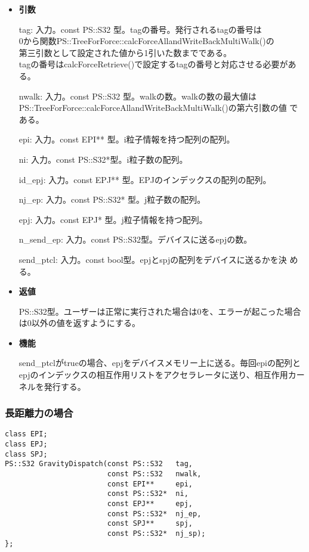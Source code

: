 \begin{itemize}

\item {\bf 引数}

  tag: 入力。const PS::S32 型。tagの番号。発行されるtagの番号は\\
  0から関数PS::TreeForForce::calcForceAllandWriteBackMultiWalk()の\\
  第三引数として設定された値から1引いた数までである。\\
  tagの番号はcalcForceRetrieve()で設定するtagの番号と対応させる必要がある。

  nwalk: 入力。const PS::S32 型。walkの数。walkの数の最大値は
  PS::TreeForForce::calcForceAllandWriteBackMultiWalk()の第六引数の値
  である。

  epi: 入力。const EPI** 型。i粒子情報を持つ配列の配列。

  ni: 入力。const PS::S32*型。i粒子数の配列。

  id\_epj: 入力。const EPJ** 型。EPJのインデックスの配列の配列。
  
  nj\_ep: 入力。const PS::S32* 型。j粒子数の配列。

  epj: 入力。const EPJ* 型。j粒子情報を持つ配列。

  n\_send\_ep: 入力。const PS::S32型。デバイスに送るepjの数。

  send\_ptcl: 入力。const bool型。epjとspjの配列をデバイスに送るかを決
  める。

\item {\bf 返値}

  PS::S32型。ユーザーは正常に実行された場合は0を、エラーが起こった場合
  は0以外の値を返すようにする。
  
\item {\bf 機能}

send\_ptclがtrueの場合、epjをデバイスメモリー上に送る。毎回epiの配列と
epjのインデックスの相互作用リストをアクセラレータに送り、相互作用カー
ネルを発行する。


  
\end{itemize}


\subsubsection{長距離力の場合}
\begin{lstlisting}[caption=calcForceDispatch]
class EPI;
class EPJ;
class SPJ;
PS::S32 GravityDispatch(const PS::S32   tag,
                        const PS::S32   nwalk,
                        const EPI**     epi,
                        const PS::S32*  ni,
                        const EPJ**     epj,
                        const PS::S32*  nj_ep,
                        const SPJ**     spj,
                        const PS::S32*  nj_sp);
};
\end{lstlisting}


